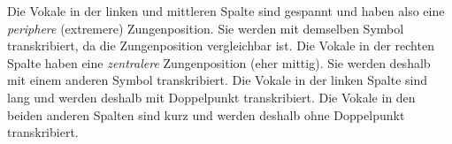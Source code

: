 \begin{table}
    \centering
 \caption{Einteilung der deutschen Vokale in gespannt/ungespannt und lang/kurz}
        \label{tab:GespanntUngespannt}
\end{table}

Die Vokale in der linken und mittleren Spalte sind gespannt und haben also eine \textit{periphere} (extremere) Zungenposition. Sie werden mit demselben Symbol transkribiert, da die Zungenposition vergleichbar ist. Die Vokale in der rechten Spalte haben eine \textit{zentralere} Zungenposition (eher mittig). Sie werden deshalb mit einem anderen Symbol transkribiert. Die Vokale in der linken Spalte sind lang und werden deshalb mit Doppelpunkt transkribiert. Die Vokale in den beiden anderen Spalten sind kurz und werden deshalb ohne Doppelpunkt transkribiert.

